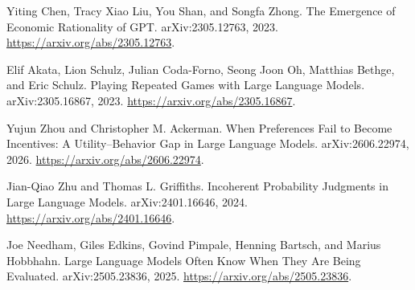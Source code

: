 Yiting Chen, Tracy Xiao Liu, You Shan, and Songfa Zhong.
\newblock The Emergence of Economic Rationality of GPT.
\newblock arXiv:2305.12763, 2023.
\newblock \url{https://arxiv.org/abs/2305.12763}.

Elif Akata, Lion Schulz, Julian Coda-Forno, Seong Joon Oh, Matthias Bethge, and Eric Schulz.
\newblock Playing Repeated Games with Large Language Models.
\newblock arXiv:2305.16867, 2023.
\newblock \url{https://arxiv.org/abs/2305.16867}.

Yujun Zhou and Christopher M. Ackerman.
\newblock When Preferences Fail to Become Incentives: A Utility--Behavior Gap in Large Language Models.
\newblock arXiv:2606.22974, 2026.
\newblock \url{https://arxiv.org/abs/2606.22974}.

Jian-Qiao Zhu and Thomas L. Griffiths.
\newblock Incoherent Probability Judgments in Large Language Models.
\newblock arXiv:2401.16646, 2024.
\newblock \url{https://arxiv.org/abs/2401.16646}.

Joe Needham, Giles Edkins, Govind Pimpale, Henning Bartsch, and Marius Hobbhahn.
\newblock Large Language Models Often Know When They Are Being Evaluated.
\newblock arXiv:2505.23836, 2025.
\newblock \url{https://arxiv.org/abs/2505.23836}.
